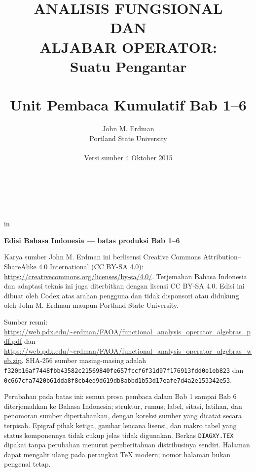 \documentclass[11pt,reqno]{amsbook}
\theoremstyle{definition}
\theoremstyle{remark}
\numberwithin{equation}{section}
\begin{document}
 \frontmatter
 \title{ANALISIS FUNGSIONAL \\ DAN \\ ALJABAR OPERATOR: \\ Suatu Pengantar \\ \mbox{} \\ \large Unit Pembaca Kumulatif Bab 1--6}
 \author{John M. Erdman \\
      Portland State University \\
      \mbox{\hphantom{P}} \\
      Versi sumber 4 Oktober 2015 \\
      \mbox{\hphantom{P}} \\
      \mbox{\hphantom{P}} \\
            \mbox{\hphantom{P}} \\
                  \mbox{\hphantom{P}} }


 in


\maketitle


\begin{center}
\textbf{Edisi Bahasa Indonesia --- batas produksi Bab 1--6}
\end{center}

Karya sumber John M. Erdman ini berlisensi Creative Commons
Attribution--ShareAlike 4.0 International (CC BY-SA 4.0):
\url{https://creativecommons.org/licenses/by-sa/4.0/}.
Terjemahan Bahasa Indonesia dan adaptasi teknis ini juga diterbitkan dengan
lisensi CC BY-SA 4.0. Edisi ini dibuat oleh Codex atas arahan pengguna dan tidak
disponsori atau didukung oleh John M. Erdman maupun Portland State University.

\begin{sloppypar}
Sumber resmi:
\url{https://web.pdx.edu/~erdman/FAOA/functional_analysis_operator_algebras_pdf.pdf}
dan
\url{https://web.pdx.edu/~erdman/FAOA/functional_analysis_operator_algebras_web.zip}.
SHA-256 sumber masing-masing adalah
\texttt{f320b16af7448fbb43582c21569840fe\allowbreak657fccf6f31d97f176913fdd0e1eb823}
dan
\texttt{0c667cfa7420b61dda8f8cb4ed9d619d\allowbreak b8abbd1b53d17eafe7d4a2e153342e53}.
\end{sloppypar}

Perubahan pada batas ini: semua prosa pembaca dalam Bab 1 sampai Bab 6
diterjemahkan ke Bahasa Indonesia; struktur, rumus, label, sitasi, latihan,
dan penomoran sumber dipertahankan, dengan koreksi sumber yang dicatat secara
terpisah. Epigraf pihak ketiga, gambar lencana lisensi, dan makro tabel yang
status komponennya tidak cukup jelas tidak digunakan. Berkas
\texttt{DIAGXY.TEX} dipakai tanpa perubahan menurut pemberitahuan distribusinya
sendiri. Halaman dapat
mengalir ulang pada perangkat TeX modern; nomor halaman bukan pengenal tetap.
\end{document}
